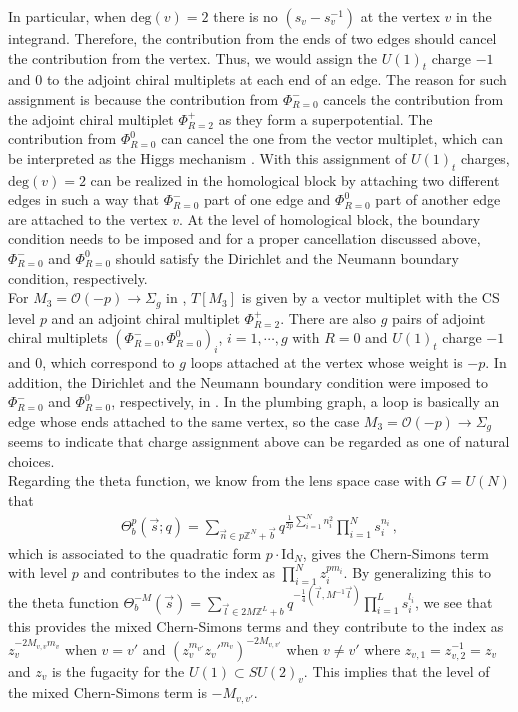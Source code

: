 \documentclass[11pt,hyper,a4paper]{article}
\begin{document}
In particular, when $\text{deg}(v)=2$ there is no $(s_v-s_v^{-1})$ at the vertex $v$ in the integrand.
Therefore, the contribution from the ends of two edges should cancel the contribution from the vertex.
Thus, we would assign the $U(1)_t$ charge $-1$ and $0$ to the adjoint chiral multiplets at each end of an edge.
The reason for such assignment is because the contribution from $\Phi^{-}_{R=0}$ cancels the contribution from the adjoint chiral multiplet $\Phi_{R=2}^{+}$ as they form a superpotential.
The contribution from $\Phi^{0}_{R=0}$ can cancel the one from the vector multiplet, which can be interpreted as the Higgs mechanism \cite{Benini-Zaffaroni, Benini-Zaffaroni2}.	
With this assignment of $U(1)_t$ charges, $\text{deg}(v)=2$ can be realized in the homological block by attaching two different edges in such a way that $\Phi^{-}_{R=0}$ part of one edge and $\Phi^{0}_{R=0}$ part of another edge are attached to the vertex $v$.
At the level of homological block, the boundary condition needs to be imposed and for a proper cancellation discussed above, $\Phi^{-}_{R=0}$ and $\Phi^{0}_{R=0}$ should satisfy the Dirichlet and the Neumann boundary condition, respectively.	\\


For $M_3=\mathcal{O}(-p) \rightarrow \Sigma_g$ in \cite{Gukov-Pei-Putrov-Vafa}, $T[M_3]$ is given by a vector multiplet with the CS level $p$ and an adjoint chiral multiplet $\Phi_{R=2}^+$.
There are also $g$ pairs of adjoint chiral multiplets $(\Phi^{-}_{R=0}, \Phi^{0}_{R=0})_i$, $i=1, \cdots, g$ with $R=0$ and $U(1)_t$ charge $-1$ and $0$, which correspond to $g$ loops attached at the vertex whose weight is $-p$.
In addition, the Dirichlet and the Neumann boundary condition were imposed to $\Phi^{-}_{R=0}$ and $\Phi^{0}_{R=0}$, respectively, in \cite{Gukov-Pei-Putrov-Vafa}.
In the plumbing graph, a loop is basically an edge whose ends attached to the same vertex, so the case $M_3=\mathcal{O}(-p) \rightarrow \Sigma_g$ seems to indicate that charge assignment above can be regarded as one of natural choices.	\\


Regarding the theta function, we know from the lens space case with $G=U(N)$ \cite{Gukov-Putrov-Vafa, Gukov-Pei-Putrov-Vafa} that 
\begin{align}
\Theta^{p}_b(\vec{s};q) = \sum_{\vec{n} \in p \mathbb{Z}^N +\vec{b}} q^{\frac{1}{2p}\sum_{i=1}^N n_i^2} \prod_{i=1}^N s_i^{n_i}	\,	,
\end{align}
which is associated to the quadratic form $p \cdot \text{Id}_{N}$, gives the Chern-Simons term with level $p$ and contributes to the index as $\prod_{i=1}^N z_i^{p m_i}$.
By generalizing this to the theta function $\Theta_b^{-M}(\vec{s}) = \sum_{\vec{l} \in 2M \mathbb{Z}^L +b} q^{-\frac{1}{4} (\vec{l}, M^{-1} \vec{l})} \prod_{i=1}^L s_i^{l_i}$, we see that this provides the mixed Chern-Simons terms and they contribute to the index as $z_v^{-2M_{v,v} m_v}$ when $v = v'$ and $(z_v^{m_{v'}} z_v'^{m_{v}})^{-2M_{v,v'}}$ when $v \neq v'$ where $z_{v,1}=z_{v,2}^{-1}=z_v$ and $z_v$ is the fugacity for the $U(1) \subset SU(2)_v$.
This implies that the level of the mixed Chern-Simons term is $-M_{v, v'}$.	\\
\end{document}

